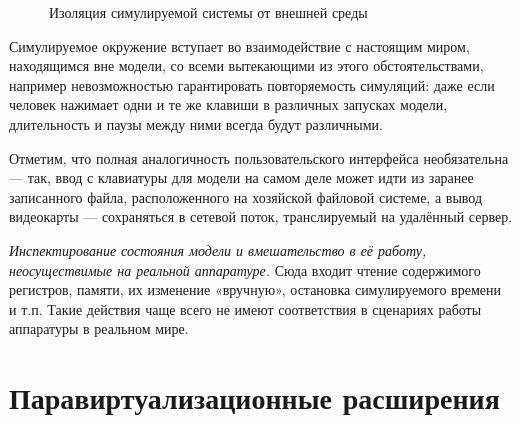 \begin{enumerate*}
\begin{figure}[htp]
	\caption{Изоляция симулируемой системы от внешней среды}
	\label{fig:isolate}
\end{figure}

Симулируемое окружение вступает во взаимодействие с настоящим миром, находящимся вне модели, со всеми вытекающими из этого обстоятельствами, например невозможностью гарантировать повторяемость симуляций: даже если человек нажимает одни и те же клавиши в различных запусках модели, длительность и паузы между ними всегда будут различными.

Отметим, что полная аналогичность пользовательского интерфейса необязательна --- так, ввод с клавиатуры для модели на самом деле может идти из заранее записанного файла, расположенного на хозяйской файловой системе, а вывод видеокарты --- сохраняться в сетевой поток, транслируемый на удалённый сервер.

\item \textit{Инспектирование состояния модели и вмешательство в её работу, неосуществимые на реальной аппаратуре.} Сюда входит чтение содержимого регистров, памяти, их изменение «вручную», остановка симулируемого времени и т.п. Такие действия чаще всего не имеют соответствия в сценариях работы аппаратуры в реальном мире.
\end{enumerate*}

\section{Паравиртуализационные расширения}

